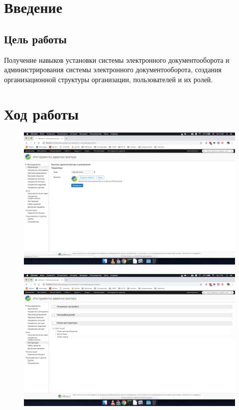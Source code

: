 \chapter{Введение}

\section{Цель работы}

Получение навыков установки системы электронного документооборота
и администрирования системы электронного документооборота, создания организационной структуры организации, пользователей и их ролей.

\chapter{Ход работы}


\begin{figure}[H]
	\centering
	\includegraphics[width=.8\textwidth]{images/1.png}
\end{figure}

\begin{figure}[H]
	\centering
	\includegraphics[width=.8\textwidth]{images/2.png}
\end{figure}

